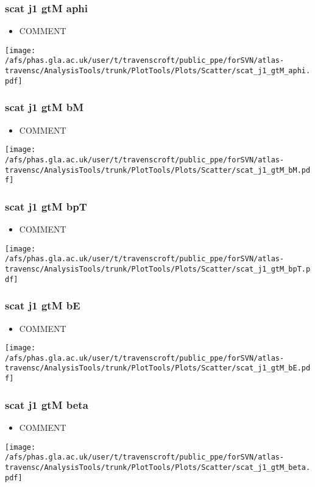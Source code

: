 \documentclass{beamer}
\begin{document}
\begin{frame}
\frametitle{scat j1 gtM aphi}
\begin{itemize}
\item COMMENT
\end{itemize}
\begin{center}
\texttt{[image: /afs/phas.gla.ac.uk/user/t/travenscroft/public\_ppe/forSVN/atlas-travensc/AnalysisTools/trunk/PlotTools/Plots/Scatter/scat\_j1\_gtM\_aphi.pdf]}
\end{center}
\end{frame}

\begin{frame}
\frametitle{scat j1 gtM bM}
\begin{itemize}
\item COMMENT
\end{itemize}
\begin{center}
\texttt{[image: /afs/phas.gla.ac.uk/user/t/travenscroft/public\_ppe/forSVN/atlas-travensc/AnalysisTools/trunk/PlotTools/Plots/Scatter/scat\_j1\_gtM\_bM.pdf]}
\end{center}
\end{frame}

\begin{frame}
\frametitle{scat j1 gtM bpT}
\begin{itemize}
\item COMMENT
\end{itemize}
\begin{center}
\texttt{[image: /afs/phas.gla.ac.uk/user/t/travenscroft/public\_ppe/forSVN/atlas-travensc/AnalysisTools/trunk/PlotTools/Plots/Scatter/scat\_j1\_gtM\_bpT.pdf]}
\end{center}
\end{frame}

\begin{frame}
\frametitle{scat j1 gtM bE}
\begin{itemize}
\item COMMENT
\end{itemize}
\begin{center}
\texttt{[image: /afs/phas.gla.ac.uk/user/t/travenscroft/public\_ppe/forSVN/atlas-travensc/AnalysisTools/trunk/PlotTools/Plots/Scatter/scat\_j1\_gtM\_bE.pdf]}
\end{center}
\end{frame}

\begin{frame}
\frametitle{scat j1 gtM beta}
\begin{itemize}
\item COMMENT
\end{itemize}
\begin{center}
\texttt{[image: /afs/phas.gla.ac.uk/user/t/travenscroft/public\_ppe/forSVN/atlas-travensc/AnalysisTools/trunk/PlotTools/Plots/Scatter/scat\_j1\_gtM\_beta.pdf]}
\end{center}
\end{frame}
\end{document}
